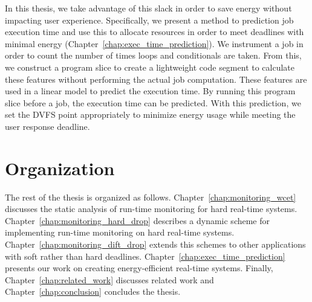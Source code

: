 In this thesis, we take advantage of this slack in order to save energy without
impacting user experience. Specifically, we present a method to prediction job
execution time and use this to allocate resources in order to meet deadlines
with minimal energy (Chapter~\ref{chap:exec_time_prediction}). We instrument a
job in order to count the number of times loops and conditionals are
taken. From this, we construct a program slice to create a lightweight code
segment to calculate these features without performing the actual job
computation. These features are used in a linear model to predict the execution
time. By running this program slice before a job, the execution time can be
predicted. With this prediction, we set the DVFS point appropriately to
minimize energy usage while meeting the user response deadline.

\section{Organization}
The rest of the thesis is organized as follows.
Chapter~\ref{chap:monitoring_wcet} discusses the static analysis of run-time
monitoring for hard real-time systems. Chapter~\ref{chap:monitoring_hard_drop}
describes a dynamic scheme for implementing run-time monitoring on hard
real-time systems. Chapter~\ref{chap:monitoring_dift_drop} extends this schemes
to other applications with soft rather than hard deadlines.
Chapter~\ref{chap:exec_time_prediction} presents our work on creating
energy-efficient real-time systems. Finally, Chapter~\ref{chap:related_work}
discusses related work and Chapter~\ref{chap:conclusion} concludes the thesis.
